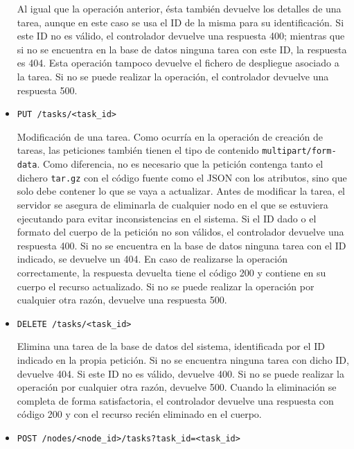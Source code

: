 \begin{itemize}
          Al igual que la operación anterior, ésta también devuelve los detalles
          de una tarea, aunque en este caso se usa el ID de la misma para su
          identificación. Si este ID no es válido, el controlador devuelve una
          respuesta 400; mientras que si no se encuentra en la base de datos
          ninguna tarea con este ID, la respuesta es 404. Esta operación tampoco
          devuelve el fichero de despliegue asociado a la tarea. Si no se puede
          realizar la operación, el controlador devuelve una respuesta 500.

    \item \texttt{PUT /tasks/<task\_id>}

          Modificación de una tarea. Como ocurría en la operación de creación de
          tareas, las peticiones también tienen el tipo de contenido
          \texttt{multipart/form-data}. Como diferencia, no es necesario que la
          petición contenga tanto el dichero \texttt{tar.gz} con el código
          fuente como el JSON con los atributos, sino que solo debe contener lo
          que se vaya a actualizar. Antes de modificar la tarea, el servidor se
          asegura de eliminarla de cualquier nodo en el que se estuviera
          ejecutando para evitar inconsistencias en el sistema. Si el ID dado o
          el formato del cuerpo de la petición no son válidos, el controlador
          devuelve una respuesta 400. Si no se encuentra en la base de datos
          ninguna tarea con el ID indicado, se devuelve un 404. En caso de
          realizarse la operación correctamente, la respuesta devuelta tiene el
          código 200 y contiene en su cuerpo el recurso actualizado. Si no se
          puede realizar la operación por cualquier otra razón, devuelve una
          respuesta 500.

    \item \texttt{DELETE /tasks/<task\_id>}

          Elimina una tarea de la base de datos del sistema, identificada por el
          ID indicado en la propia petición. Si no se encuentra ninguna tarea
          con dicho ID, devuelve 404. Si este ID no es válido, devuelve 400. Si
          no se puede realizar la operación por cualquier otra razón, devuelve
          500. Cuando la eliminación se completa de forma satisfactoria, el
          controlador devuelve una respuesta con código 200 y con el recurso
          recién eliminado en el cuerpo.

    \item \texttt{POST /nodes/<node\_id>/tasks?task\_id=<task\_id>}


\end{itemize}
